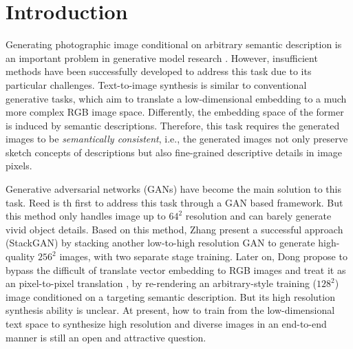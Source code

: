 \documentclass[10pt,twocolumn,letterpaper]{article}
\begin{document}
\section{Introduction}
Generating photographic image conditional on arbitrary semantic description is an important problem in generative model research \cite{reed2016generative}. However, insufficient methods have been successfully developed to address this task due to its particular challenges. Text-to-image synthesis is similar to conventional generative tasks, which aim to translate a low-dimensional embedding  to a much more complex RGB image space.  Differently, the embedding space of the former is induced by semantic descriptions. Therefore, this task requires the generated images to be \textit{semantically consistent}, i.e., the generated images not only preserve sketch concepts of descriptions but also fine-grained descriptive details in image pixels. 

Generative adversarial networks (GANs) have become the main solution to this task. 
Reed \etal \cite{reed2016generative} is th first to address this task through a GAN based framework. But this method only handles image up to $64^2$ resolution and can barely generate vivid object details.
Based on this method, Zhang \etal \cite{han2017stackgan} present a successful approach (StackGAN) by stacking another low-to-high resolution GAN to generate high-quality $256^2$ images, with two separate stage training. Later on, Dong \etal \cite{dong2017semantic} propose to bypass the difficult of translate vector embedding to RGB images and treat it as an pixel-to-pixel translation \cite{isola2016image}, by re-rendering an arbitrary-style training ($128^2$) image conditioned on a targeting semantic description. But its high resolution synthesis ability is unclear. 
At present, how to train from the low-dimensional text space to synthesize high resolution and diverse images in an end-to-end manner is still an open and attractive question. 
\end{document}

